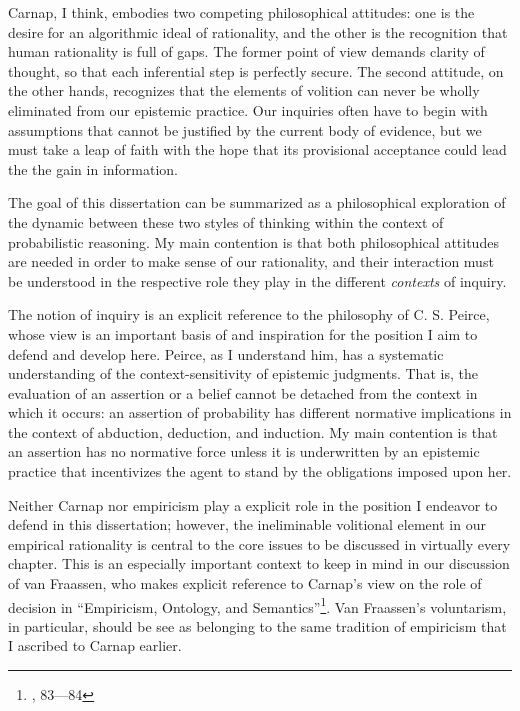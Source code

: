 Carnap, I think, embodies two competing philosophical attitudes: one is
the desire for an algorithmic ideal of rationality, and the other is the
recognition that human rationality is full of gaps. The former point of
view demands clarity of thought, so that each inferential step is
perfectly secure. The second attitude, on the other hands, recognizes that the elements of volition can never be wholly eliminated from our epistemic practice. Our inquiries often have to begin with assumptions that cannot be justified by the current body of evidence, but we must take a leap of faith with the hope that its provisional acceptance could lead the the gain in information.

The goal of this dissertation can be summarized as a philosophical
exploration of the dynamic between these two styles of thinking within
the context of probabilistic reasoning. My main contention is that both
philosophical attitudes are needed in order to make sense of our rationality, and
their interaction must be understood in the respective role they play in
the different \emph{contexts} of inquiry.

The notion of inquiry is an explicit reference to the philosophy of C.
S. Peirce, whose view is an important basis of and inspiration for the
position I aim to defend and develop here. Peirce, as I understand him,
has a systematic understanding of the context-sensitivity of epistemic
judgments. That is, the evaluation of an assertion or a belief cannot be
detached from the context in which it occurs: an assertion of
probability has different normative implications in the context of
abduction, deduction, and induction. My main contention is that an
assertion has no normative force unless it is underwritten by an
epistemic practice that incentivizes the agent to stand by the
obligations imposed upon her.

Neither Carnap nor empiricism play a explicit role in the position I endeavor to defend in this dissertation; however, the ineliminable volitional element in our empirical rationality is central to the core issues to be discussed in virtually every chapter. This is an especially important context to keep in mind in our discussion of van Fraassen, who makes explicit reference to Carnap's view on the role of decision in ``Empiricism, Ontology, and Semantics''\footnote{\cite{antinatural}, 83---84}. Van Fraassen's voluntarism, in particular, should be see as belonging to the same tradition of empiricism that I ascribed to Carnap earlier.





